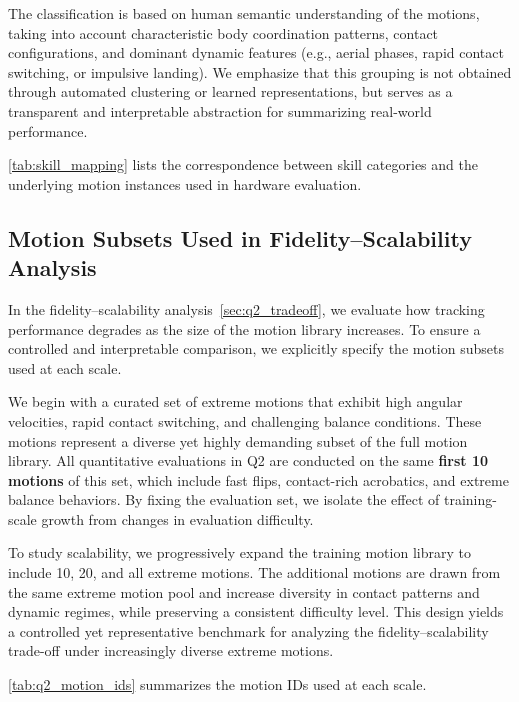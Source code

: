 The classification is based on human semantic understanding of the motions,
taking into account characteristic body coordination patterns,
contact configurations, and dominant dynamic features
(e.g., aerial phases, rapid contact switching, or impulsive landing).
We emphasize that this grouping is not obtained through automated clustering
or learned representations, but serves as a transparent and interpretable
abstraction for summarizing real-world performance.


\cref{tab:skill_mapping} lists the correspondence between skill categories
and the underlying motion instances used in hardware evaluation.

\subsection{Motion Subsets Used in Fidelity--Scalability Analysis}
\label{sec:supp_q2_motions}
In the fidelity--scalability analysis~\cref{sec:q2_tradeoff}, we evaluate how tracking performance
degrades as the size of the motion library increases.
To ensure a controlled and interpretable comparison, we explicitly specify
the motion subsets used at each scale.

We begin with a curated set of extreme motions that exhibit
high angular velocities, rapid contact switching, and challenging balance conditions.
These motions represent a diverse yet highly demanding subset of the full motion library.
All quantitative evaluations in Q2 are conducted on the same \textbf{first 10 motions}
of this set, which include fast flips, contact-rich acrobatics, and extreme balance behaviors.
By fixing the evaluation set, we isolate the effect of training-scale growth
from changes in evaluation difficulty.

To study scalability, we progressively expand the training motion library
to include 10, 20, and all extreme motions.
The additional motions are drawn from the same extreme motion pool and increase
diversity in contact patterns and dynamic regimes, while preserving a consistent
difficulty level.
This design yields a controlled yet representative benchmark for analyzing
the fidelity--scalability trade-off under increasingly diverse extreme motions.

\cref{tab:q2_motion_ids} summarizes the motion IDs used at each scale.

